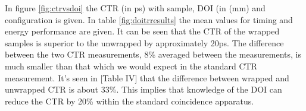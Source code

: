 In figure \ref{fig:ctrvsdoi} the CTR (in ps) with sample, DOI (in (mm) and configuration is given. In table \ref{fig:doitrresults} the mean values for timing and energy performance are given. It can be seen that the CTR of the wrapped samples is superior to the unwrapped by approximately 20ps. The difference between the two CTR measurements, 8\% averaged between the measurements, is much smaller than that which we would expect in the standard CTR measurement. It's seen in [Table IV]\cite{r_Paganoni_Pauwels_et_al__2011} that the difference between wrapped and unwrapped CTR is about 33\%. This implies that knowledge of the DOI can reduce the CTR by 20\% within the standard coincidence apparatus.